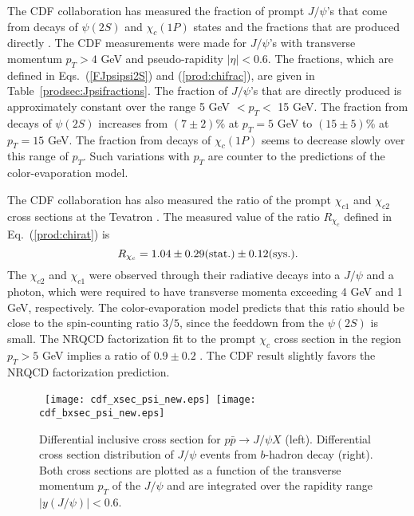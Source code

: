 The CDF collaboration has measured the fraction of prompt 
$J/\psi$'s that come from decays of $\psi(2S)$ and $\chi_c(1P)$ 
states and the fractions that are produced directly \cite{Abe:1997yz}.  
The CDF measurements were made for $J/\psi$'s 
with transverse momentum $p_T > 4$ GeV
and pseudo-rapidity $|\eta| < 0.6$.
The fractions, which are defined in Eqs.~(\ref{FJpsipsi2S}) 
and (\ref{prod:chifrac}), are given in Table~\ref{prodsec:Jpsifractions}.
The fraction of $J/\psi$'s that are directly produced is 
approximately constant over the range 5 GeV $< p_T <$ 15 GeV.
The fraction from decays of $\psi(2S)$ increases from
$(7 \pm 2)$\% at $p_T = 5$ GeV to $(15 \pm 5)$\% at $p_T = 15$ GeV.
The fraction from decays of $\chi_c(1P)$ seems to decrease
slowly over this range of $p_T$.
Such variations with $p_T$ are counter to the predictions of the
color-evaporation model.  

The CDF collaboration has also measured the ratio of the prompt $\chi_{c1}$
and $\chi_{c2}$ cross sections at the Tevatron \cite{Affolder:2001ij}.
The measured value of the ratio $R_{\chi_c}$ defined in 
Eq.~(\ref{prod:chirat}) is
%
\begin{equation}
R_{\chi_c} = 
1.04 \pm 0.29(\hbox{stat.}) \pm 0.12(\hbox{sys.}).
\label{Rchi12Tev}
\end{equation}
%
The $\chi_{c2}$ and $\chi_{c1}$ were observed through their radiative decays
into a $J/\psi$ and a photon, which were required to have transverse
momenta exceeding 4 GeV and 1 GeV, respectively. The color-evaporation
model predicts that this ratio should be 
close to the spin-counting ratio $3/5$, 
since the feeddown from the $\psi(2S)$ is small.
The NRQCD factorization fit to the prompt $\chi_c$ cross section in the
region $p_T> 5$ GeV implies a ratio of $0.9\pm 0.2$
\cite{maltoni-chi-ratio}. The CDF result slightly favors the
NRQCD factorization prediction.


\begin{figure}[htb]
  \centerline{\hbox{ \hspace{0.2cm}
    \texttt{[image: cdf\_xsec\_psi\_new.eps]}
    \hspace{0.3cm}
    \texttt{[image: cdf\_bxsec\_psi\_new.eps]}}}
 \caption{Differential inclusive cross section for $p\bar{ p}
\rightarrow J/\psi X$ (left).
Differential  cross section distribution of $J/\psi$ events from $b$-hadron
decay (right).
Both cross sections are plotted as a function of the transverse momentum $p_T$
of the $J/\psi$ and are integrated over the rapidity range $|y(J/\psi)|<0.6$. 
\label{CDF_xsec} }
\end{figure}

